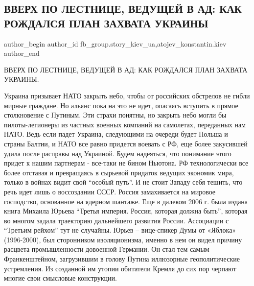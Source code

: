  
 
 
 
 
 
\subsection{ВВЕРХ ПО ЛЕСТНИЦЕ, ВЕДУЩЕЙ В АД: КАК РОЖДАЛСЯ ПЛАН ЗАХВАТА УКРАИНЫ}
\label{sec:04_03_2022.fb.fb_group.story_kiev_ua.2.plan_zahvata_ukrainy}
 
\ifcmt
 author_begin
   author_id fb_group.story_kiev_ua,atojev_konstantin.kiev
 author_end
\fi

ВВЕРХ ПО ЛЕСТНИЦЕ, ВЕДУЩЕЙ В АД: КАК РОЖДАЛСЯ ПЛАН ЗАХВАТА УКРАИНЫ.

Украина призывает НАТО закрыть небо, чтобы от российских обстрелов не гибли
мирные граждане. Но альянс пока на это не идет, опасаясь вступить в прямое
столкновение с Путиным. Эти страхи понятны, но закрыть небо могли бы
пилоты-легионеры из частных военных компаний на самолетах, переданных нам НАТО.
Ведь если падет Украина, следующими на очереди будет Польша и страны Балтии, и
НАТО все равно придется воевать с РФ, еще более закусившей удила после расправы
над Украиной. Будем надеяться, что понимание этого придет к нашим партнерам -
все-таки не бином Ньютона. РФ технологически все более отставая и превращаясь в
сырьевой придаток ведущих экономик мира, только в войнах видит свой \enquote{особый
путь}. И не стоит Западу себя тешить, что речь идет лишь о воссоздании СССР.
Россия замахивается на мировое господство, основанное на ядерном шантаже.  Еще
в далеком 2006 г. была издана книга Михаила Юрьева \enquote{Третья империя. Россия,
которая должна быть}, которая во многом задала траекторию дальнейшего развития
России. Ассоциации с \enquote{Третьим рейхом} тут не случайны. Юрьев  – вице-спикер
Думы от «Яблока» (1996-2000), был сторонником изоляционизма, именно в нем он
видел причину расцвета промышленности довоенной Германии. Он стал тем самым
Франкенштейном, загрузившим в голову Путина иллюзорные геополитические
устремления.  Из созданной им утопии обитатели Кремля до сих пор черпают многие
свои смысловые конструкции.

